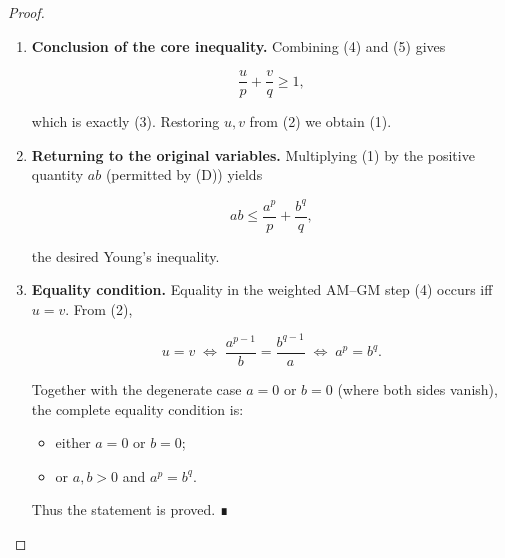 \begin{proof}
\begin{enumerate}
Because \(\frac1p+\frac1q=1\) (equivalently (C)), we have  

\[
a^{\frac{p-1}{p}-\frac1q}=a^{1-\frac1p-\frac1q}=a^{0}=1,
\qquad
b^{\frac{q-1}{q}-\frac1p}=b^{0}=1,
\]

hence  

\[
u^{1/p}v^{1/q}=1. \tag{5}
\]

\item \textbf{Conclusion of the core inequality.}  
Combining (4) and (5) gives  

\[
\frac{u}{p}+\frac{v}{q}\ge1,
\]

which is exactly (3). Restoring \(u,v\) from (2) we obtain (1).

\item \textbf{Returning to the original variables.}  
Multiplying (1) by the positive quantity \(ab\) (permitted by (D)) yields  

\[
ab\le\frac{a^{p}}{p}+\frac{b^{q}}{q},
\]

the desired Young’s inequality.

\item \textbf{Equality condition.}  
Equality in the weighted AM–GM step (4) occurs iff \(u=v\).  From (2),

\[
u=v\;\Longleftrightarrow\;
\frac{a^{p-1}}{b}=\frac{b^{q-1}}{a}
\;\Longleftrightarrow\;
a^{p}=b^{q}.
\]

Together with the degenerate case \(a=0\) or \(b=0\) (where both sides vanish), the complete equality condition is:

\begin{itemize}
\item either \(a=0\) or \(b=0\);
\item or \(a,b>0\) and \(a^{p}=b^{q}\).
\end{itemize}
Thus the statement is proved. ∎
\end{enumerate}
\end{proof}